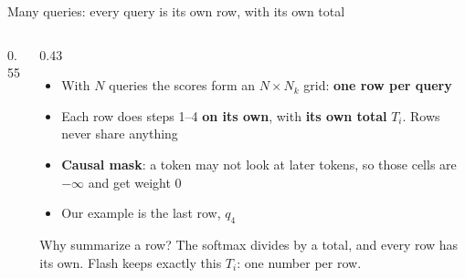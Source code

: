 \documentclass[aspectratio=169,11pt]{beamer}
\begin{document}
\begin{frame}{Many queries: every query is its own row, with its own total}
\begin{columns}[c]
\begin{column}{0.55\textwidth}
\centering
{}
\end{column}
\begin{column}{0.43\textwidth}
\small
\begin{itemize}
\item With $N$ queries the scores form an $N\times N_k$ grid: \textbf{one row per query}
\item Each row does steps 1--4 \textbf{on its own}, with \textbf{its own total} $T_i$. Rows never share anything
\item \textbf{Causal mask}: a token may not look at later tokens, so those cells are $-\infty$ and get weight 0
\item Our example is the last row, $q_4$
\end{itemize}
\begin{block}{Why summarize a row?}\small
The softmax divides by a total, and every row has its own. Flash keeps exactly this $T_i$: one number per row.
\end{block}
\end{column}
\end{columns}
\end{frame}
\end{document}
